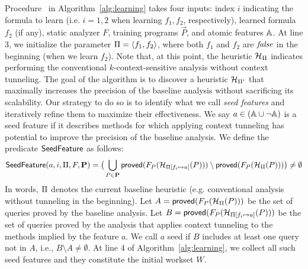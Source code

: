 Procedure \LearnBooleanFormula~in Algorithm~\ref{alg:learning} takes four inputs: index $i$
indicating the formula to learn (i.e. $i=1,2$ when learning $f_1,f_2$,
respectively), learned formula $f_2$ (if any), static analyzer $F$,
training programs $\vec{P}$, and atomic features $\mathbb{A}$.
At line 3, we initialize the parameter
$\Pi = \langle f_1, f_2 \rangle$, where both $f_1$ and $f_2$ are
${\it false}$ in the beginning (when we learn $f_2$).  Note that, at this point, the heuristic
$\mathcal{H}_{\Pi}$ indicates performing the conventional
$k$-context-sensitive analysis without context tunneling.
The goal of the algorithm is to discover a heuristic $\mathcal{H}_{\Pi'}$
that maximally increases the precision of the baseline analysis
without sacrificing its scalability. Our strategy to do so is to identify what
we call {\em seed features} and iteratively refine them to maximize
their effectiveness.
We say $a \in (\mathbb{A} \cup \neg \mathbb{A})$ is a seed feature if it describes methods
for which applying context tunneling has potential to improve the
precision of the baseline analysis.
We define the predicate $\textsf{SeedFeature}$ as follows:
\[
\textsf{SeedFeature}(a, i, \Pi, F, \mathbf{P}) =
\big( \bigcup_{P \in \mathbf{P}}{\sf proved}(F_P(\mathcal{H}_{\Pi[f_i
  \mapsto a]}(P))) \setminus
                  {\sf proved}(F_P(\mathcal{H}_{\Pi}(P)))\big)
                  \neq \emptyset
\]
In words, $\Pi$ denotes the current baseline heuristic (e.g. conventional
analysis without tunneling in the beginning).
Let $A = {\sf proved}(F_P(\mathcal{H}_{\Pi}(P)))$ be the set of
queries proved by the baseline analysis. Let $B = {\sf proved}(F_P(\mathcal{H}_{\Pi[f_i
  \mapsto a]}(P)))$ be the set of queries proved by the analysis that applies
context tunneling to the methods implied by the feature
$a$. We call $a$ seed if $B$ includes at least one query not in $A$, i.e., $B
\setminus A \not= \emptyset$.  At line 4 of
Algorithm~\ref{alg:learning}, we collect all such seed features
and they constitute the initial workset $W$.



